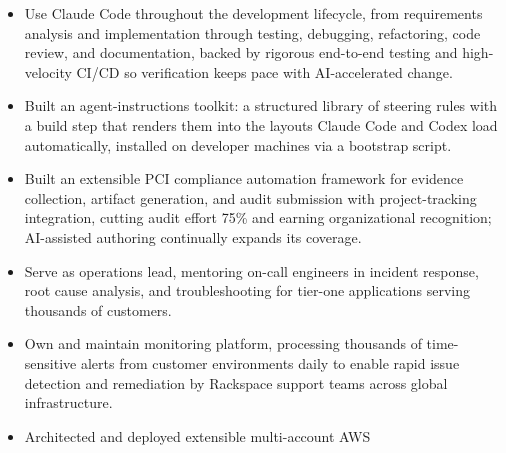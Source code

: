 \begin{experiences}
{\begin{itemize}
                        \item Use Claude Code throughout the development
                              lifecycle, from requirements analysis and
                              implementation through testing, debugging,
                              refactoring, code review, and documentation,
                              backed by rigorous end-to-end testing and
                              high-velocity CI/CD so verification keeps pace
                              with AI-accelerated change.
                        \item Built an agent-instructions toolkit: a
                              structured library of steering rules with a build
                              step that renders them into the layouts Claude
                              Code and Codex load automatically, installed on
                              developer machines via a bootstrap script.
                        \fi
                        \item Built an extensible PCI compliance automation
                              framework for evidence collection, artifact
                              generation, and audit submission with
                              project-tracking integration, cutting audit
                              effort 75\% and earning organizational
                              recognition; AI-assisted authoring continually
                              expands its coverage.
                        \item Serve as operations lead, mentoring on-call
                              engineers in incident response, root cause
                              analysis, and troubleshooting for tier-one
                              applications serving thousands of customers.
                        \ifcv
                        \item Own and maintain
                              monitoring platform, processing thousands of
                              time-sensitive alerts from customer environments
                              daily to enable rapid issue detection and
                              remediation by Rackspace support teams across
                              global infrastructure.
                        \item Architected and deployed extensible multi-account
                              AWS

\end{itemize}}
\end{experiences}
